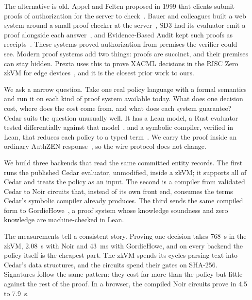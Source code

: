\documentclass[11pt]{article}
\begin{document}
The alternative is old. Appel and Felten proposed in 1999 that clients submit proofs of authorization for the server to check~\citep{appel1999pca}. Bauer and colleagues built a web system around a small proof checker at the server~\citep{bauer2001pca}, SD3 had its evaluator emit a proof alongside each answer~\citep{jim2001sd3}, and Evidence-Based Audit kept such proofs as receipts~\citep{vaughan2008evidence}. These systems proved authorization from premises the verifier could see. Modern proof systems add two things: proofs are succinct, and their premises can stay hidden. Prezta uses this to prove XACML decisions in the RISC Zero zkVM for edge devices~\citep{wei2026prezta}, and it is the closest prior work to ours.

We ask a narrow question. Take one real policy language with a formal semantics and run it on each kind of proof system available today. What does one decision cost, where does the cost come from, and what does each system guarantee? Cedar suits the question unusually well. It has a Lean model, a Rust evaluator tested differentially against that model~\citep{disselkoen2024vgd}, and a symbolic compiler, verified in Lean, that reduces each policy to a typed term~\citep{torlak2026symcert}. We carry the proof inside an ordinary AuthZEN response~\citep{authzen2026final}, so the wire protocol does not change.

We build three backends that read the same committed entity records. The first runs the published Cedar evaluator, unmodified, inside a zkVM; it supports all of Cedar and treats the policy as an input. The second is a compiler from validated Cedar to Noir circuits that, instead of its own front end, consumes the terms Cedar's symbolic compiler already produces. The third sends the same compiled form to GordieHowe~\citep{sharp2026gordiehowe}, a proof system whose knowledge soundness and zero knowledge are machine-checked in Lean.

The measurements tell a consistent story. Proving one decision takes 768~s in the zkVM, 2.08~s with Noir and 43~ms with GordieHowe, and on every backend the policy itself is the cheapest part. The zkVM spends its cycles parsing text into Cedar's data structures, and the circuits spend their gates on SHA-256. Signatures follow the same pattern: they cost far more than the policy but little against the rest of the proof. In a browser, the compiled Noir circuits prove in 4.5 to 7.9~s.
\end{document}
